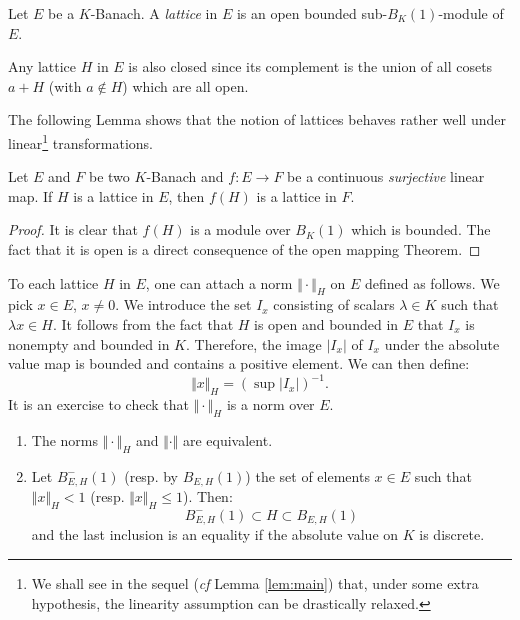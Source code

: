 \documentclass{amsart}
\begin{document}
\begin{deftn}
Let $E$ be a $K$-Banach.
A \emph{lattice} in $E$ is an open bounded sub-$B_K(1)$-module of $E$.
\end{deftn}

\begin{rmk}
Any lattice $H$ in $E$ is also closed since its complement is the
union of all cosets $a + H$ (with $a \not\in H$) which are all open.
\end{rmk}

The following Lemma shows that the notion of lattices behaves rather 
well under linear\footnote{We shall see in the sequel (\emph{cf} Lemma 
\ref{lem:main}) that, under some extra hypothesis, the linearity 
assumption can be drastically relaxed.} transformations.

\begin{lem}
\label{lem:morlat}
Let $E$ and $F$ be two $K$-Banach and $f : 
E \to F$ be a continuous \emph{surjective} linear map.
If $H$ is a lattice in $E$, then $f(H)$ is a lattice in $F$.
\end{lem}

\begin{proof}
It is clear that $f(H)$ is a module over $B_K(1)$ which is bounded.
The fact that it is open is a direct consequence of the open mapping
Theorem.
\end{proof}

To each lattice $H$ in $E$, one can attach a norm $\Vert \cdot \Vert_H$ 
on $E$ defined as follows. We pick $x \in E$, $x \neq 0$. We introduce
the set $I_x$ consisting of scalars $\lambda \in K$ such that $\lambda x 
\in H$. It follows from the fact that $H$ is open and bounded in $E$
that $I_x$ is nonempty and bounded in $K$. Therefore, the image $|I_x|$ 
of $I_x$ under the absolute value map is bounded and contains a positive
element. We can then define:
$$\Vert x \Vert_H = (\sup |I_x|)^{-1}.$$
It is an exercise to check that $\Vert \cdot \Vert_H$ is a norm over 
$E$.

\begin{lem} \label{lem:reductionball}
\begin{enumerate}
\item The norms $\Vert \cdot \Vert_H$ and $\Vert \cdot \Vert$ are 
equivalent.
\item Let $B^-_{E,H}(1)$ (resp. by $B_{E,H}(1)$) the set of elements $x 
\in E$ such that $\Vert x \Vert_H < 1$ (resp. $\Vert x \Vert_H \leq 1$).
Then:
$$B^-_{E,H}(1) \subset H \subset B_{E,H}(1)$$
and the last inclusion is an equality if the absolute value on $K$ is
discrete.
\end{enumerate}
\end{lem}
\end{document}
